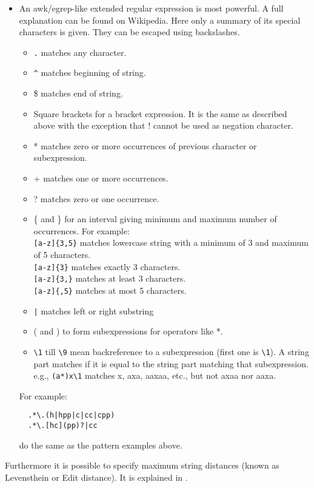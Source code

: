 \begin{itemize}
\item An awk/egrep-like extended regular expression is most powerful. A
  full explanation can be found on Wikipedia. Here only a
  summary of its special characters is given. They can be escaped
  using backslashes.
  \begin{itemize}
  \item \texttt{.} matches any character.
  \item \verb+^+ matches beginning of string.
  \item \$ matches end of string.
  \item Square brackets for a bracket expression. It is the same as
    described above with the exception that ! cannot be used as negation character.
  \item * matches zero or more occurrences of previous character or subexpression.
  \item + matches one or more occurrences.
  \item ? matches zero or one occurrence.
  \item \{ and \} for an interval giving minimum and maximum number of
    occurrences. For example:
    \\\texttt{[a-z]\{3,5\}} matches lowercase string with a minimum of 3
    and maximum of 5 characters.
    \\\texttt{[a-z]\{3\}} matches exactly 3 characters.
    \\\texttt{[a-z]\{3,\}} matches at least 3 characters.
    \\\texttt{[a-z]\{,5\}} matches at most 5 characters.
  \item \verb+|+ matches left or right substring
  \item ( and ) to form subexpressions for operators like *.
  \item \verb+\1+ till \verb+\9+ mean backreference to a subexpression (first one is
    \verb+\1+). A string part matches if it is equal to the string
    part matching that subexpression.
    e.g., \verb+(a*)x\1+ matches x, axa, aaxaa, etc.,
    but not axaa nor aaxa.
  \end{itemize}
  For example:
\begin{verbatim}
  .*\.(h|hpp|c|cc|cpp)
  .*\.[hc](pp)?|cc
\end{verbatim}
  do the same as the pattern examples above.
\end{itemize}
Furthermore it is possible to specify maximum string distances
(known as Levensthein or Edit distance). It is explained in 
.

